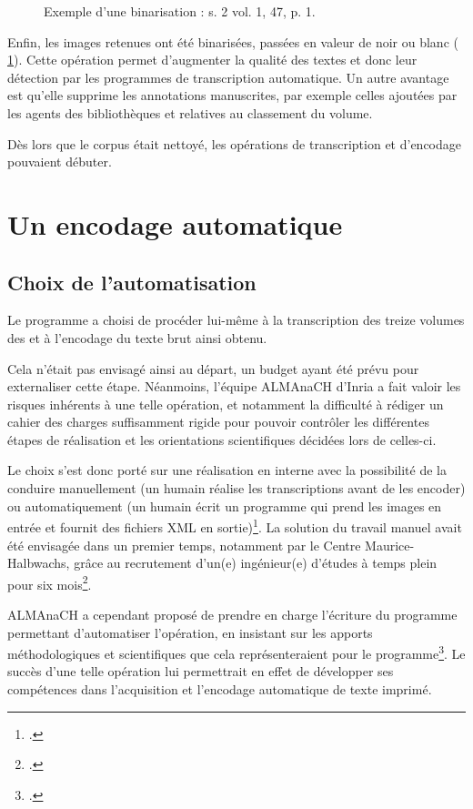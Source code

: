 \begin{figure}[h]
\begin{subfigure}[t]{0.4\textwidth}
    \end{subfigure}
    \caption[Exemple d'une binarisation]{Exemple d'une binarisation : s. 2 vol. 1, \no{} 47, p. 1.}
    \label{fig:binarisation}
\end{figure}

Enfin, les images retenues ont été binarisées, \cad{} passées en valeur de noir ou blanc (\fig{} \ref{fig:binarisation}). Cette opération permet d'augmenter la qualité des textes et donc leur détection par les programmes de transcription automatique. Un autre avantage est qu'elle supprime les annotations manuscrites, par exemple celles ajoutées par les agents des bibliothèques et relatives au classement du volume.

Dès lors que le corpus était nettoyé, les opérations de transcription et d'encodage pouvaient débuter.

\chapter{Un encodage automatique}

\section{Choix de l'automatisation}
Le programme \timeus{} a choisi de procéder lui-même à la transcription des treize volumes des \odm{} et à l'encodage du texte brut ainsi obtenu. 

Cela n'était pas envisagé ainsi au départ, un budget ayant été prévu pour externaliser cette étape. Néanmoins, l'équipe ALMAnaCH d'Inria a fait valoir les risques inhérents à une telle opération, et notamment la difficulté à rédiger un cahier des charges suffisamment rigide pour pouvoir contrôler les différentes étapes de réalisation et les orientations scientifiques décidées lors de celles-ci.

Le choix s'est donc porté sur une réalisation en interne avec la possibilité de la conduire manuellement (un humain réalise les transcriptions avant de les encoder) ou automatiquement (un humain écrit un programme qui prend les images en entrée et fournit des fichiers XML en sortie)\footcite[p. 52]{chague}. La solution du travail manuel avait été envisagée dans un premier temps, notamment par le Centre Maurice-Halbwachs, grâce au recrutement d'un(e) ingénieur(e) d'études à temps plein pour six mois\footcite[p. 52]{chague}. 

ALMAnaCH a cependant proposé de prendre en charge l'écriture du programme permettant d'automatiser l'opération, en insistant sur les apports méthodologiques et scientifiques que cela représenteraient pour le programme\footcite[p. 52]{chague}. Le succès d'une telle opération lui permettrait en effet de développer ses compétences dans l'acquisition et l'encodage automatique de texte imprimé.

